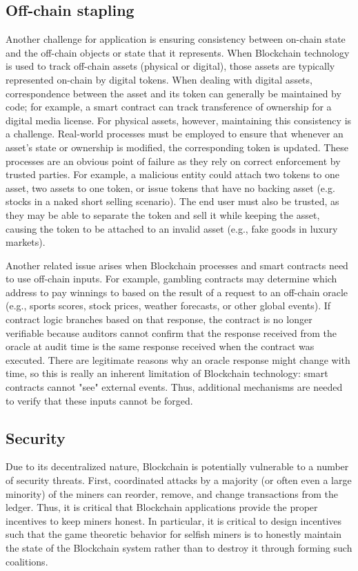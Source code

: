 \subsection{Off-chain stapling}
Another challenge for application is ensuring consistency between on-chain state and the off-chain objects or state that it represents.  When Blockchain technology is used to track off-chain assets (physical or digital), those assets are typically represented on-chain by digital tokens. When dealing with digital assets, correspondence between the asset and its token can generally be maintained by code; for example, a smart contract can track transference of ownership for a digital media license. For physical assets, however, maintaining this consistency is a challenge. Real-world processes must be employed to ensure that whenever an asset's state or ownership is modified, the corresponding token is updated. These processes are an obvious point of failure as they rely on correct enforcement by trusted parties. For example, a malicious entity could attach two tokens to one asset, two assets to one token, or issue tokens that have no backing asset (e.g. stocks in a naked short selling scenario). The end user must also be trusted, as they may be able to separate the token and sell it while keeping the asset, causing the token to be attached to an invalid asset (e.g., fake goods in luxury markets).

Another related issue arises when Blockchain processes and smart contracts need to use off-chain inputs. For example, gambling contracts may determine which address to pay winnings to based on the result of a request to an off-chain oracle (e.g., sports scores, stock prices, weather forecasts, or other global events). If contract logic branches based on that response, the contract is no longer verifiable because auditors cannot confirm that the response received from the oracle at audit time is the same response received when the contract was executed. There are legitimate reasons why an oracle response might change with time, so this is really an inherent limitation of Blockchain technology: smart contracts cannot "see" external events.  Thus, additional mechanisms are needed to verify that these inputs cannot be forged.

\subsection{Security}
Due to its decentralized nature, Blockchain is potentially vulnerable to a number of security threats.  First, coordinated attacks by a majority (or often even a large minority) of the miners can reorder, remove, and change transactions from the ledger. Thus, it is critical that Blockchain applications provide the proper incentives to keep miners honest.  In particular, it is critical to design incentives such that the game theoretic behavior for selfish miners is to honestly maintain the state of the Blockchain system rather than to destroy it through forming such coalitions.

